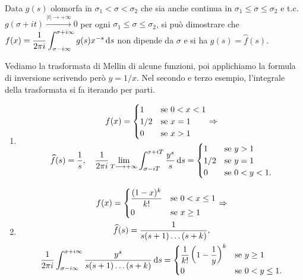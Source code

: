 \begin{oss}
  Data $g(s)$ olomorfa in $\sigma_1 < \sigma < \sigma_2$ che sia anche continua in $\sigma_1 \le \sigma \le \sigma_2$ e t.c. $g(\sigma+it) \overset{|t| \longrightarrow +\infty}{\longrightarrow} 0$ per ogni $\sigma_1 \le \sigma \le \sigma_2$, si può dimostrare che $\displaystyle f(x)=\frac{1}{2\pi i}\int_{\sigma-i\infty}^{\sigma+i\infty} g(s)x^{-s}\mathop{}\!\mathrm{d} s$ non dipende da $\sigma$ e si ha $g(s)=\wideparen{f}(s)$.
\end{oss}

\begin{ex}
  Vediamo la trasformata di Mellin di alcune funzioni, poi applichiamo la formula di inversione scrivendo però $y=1/x$. Nel secondo e terzo esempio, l'integrale della trasformata si fa iterando per parti.
  \begin{enumerate}
    \item
    \begin{gather*}
      f(x)=\begin{cases}
        1 &\mbox{se } 0<x<1 \\
        1/2 &\mbox{se } x=1 \\
        0 &\mbox{se } x>1
    \end{cases} \implies \\
    \wideparen{f}(s)=\frac{1}{s}, \quad \frac{1}{2\pi i}\lim_{T \longrightarrow +\infty} \int_{\sigma-iT}^{\sigma+iT} \frac{y^s}{s}\diff s=\begin{cases}
      1 &\mbox{se } y>1 \\
      1/2 &\mbox{se } y=1 \\
      0 &\mbox{se } 0<y<1.
    \end{cases}
  \end{gather*}
  \item
  \begin{gather*}
    f(x)=\begin{cases}
      \dfrac{(1-x)^k}{k!} &\mbox{se } 0<x \le 1 \\
      0 &\mbox{se } x \ge 1
      \end{cases} \implies \\
      \wideparen{f}(s)=\frac{1}{s(s+1)\dots(s+k)}, \\ \frac{1}{2\pi i} \int_{\sigma-i\infty}^{\sigma+i\infty} \frac{y^s}{s(s+1)\dots(s+k)}\diff s=\begin{cases}
        \dfrac{1}{k!}\left(1-\dfrac{1}{y}\right)^k &\mbox{se } y \ge 1 \\
        0 &\mbox{se } 0<y \le 1.
      \end{cases}

\end{gather*}
\end{enumerate}
\end{ex}
